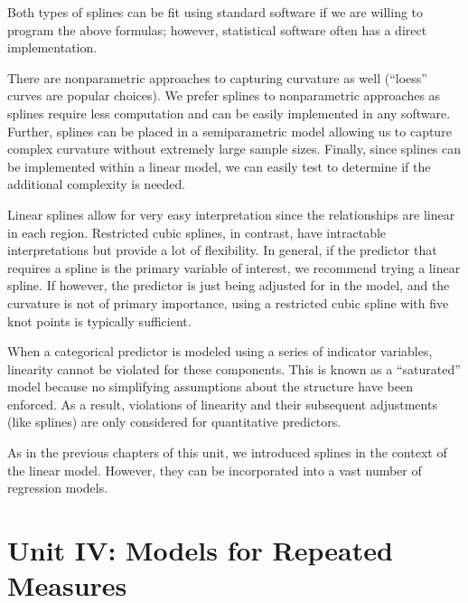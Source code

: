 \documentclass[
  letterpaper,
  DIV=11,
  numbers=noendperiod]{scrreprt}
\theoremstyle{definition}
\theoremstyle{definition}
\theoremstyle{remark}
\begin{document}
Both types of splines can be fit using standard software if we are
willing to program the above formulas; however, statistical software
often has a direct implementation.

There are nonparametric approaches to capturing curvature as well
(``loess'' curves are popular choices). We prefer splines to
nonparametric approaches as splines require less computation and can be
easily implemented in any software. Further, splines can be placed in a
semiparametric model allowing us to capture complex curvature without
extremely large sample sizes. Finally, since splines can be implemented
within a linear model, we can easily test to determine if the additional
complexity is needed.

Linear splines allow for very easy interpretation since the
relationships are linear in each region. Restricted cubic splines, in
contrast, have intractable interpretations but provide a lot of
flexibility. In general, if the predictor that requires a spline is the
primary variable of interest, we recommend trying a linear spline. If
however, the predictor is just being adjusted for in the model, and the
curvature is not of primary importance, using a restricted cubic spline
with five knot points is typically sufficient.

\begin{tcolorbox}[enhanced jigsaw, bottomrule=.15mm, titlerule=0mm, bottomtitle=1mm, colback=white, coltitle=black, rightrule=.15mm, leftrule=.75mm, toprule=.15mm, toptitle=1mm, left=2mm, opacityback=0, colframe=quarto-callout-note-color-frame, breakable, title=\textcolor{quarto-callout-note-color}{\faInfo}\hspace{0.5em}{Note}, arc=.35mm, colbacktitle=quarto-callout-note-color!10!white, opacitybacktitle=0.6]

When a categorical predictor is modeled using a series of indicator
variables, linearity cannot be violated for these components. This is
known as a ``saturated'' model because no simplifying assumptions about
the structure have been enforced. As a result, violations of linearity
and their subsequent adjustments (like splines) are only considered for
quantitative predictors.

\end{tcolorbox}

As in the previous chapters of this unit, we introduced splines in the
context of the linear model. However, they can be incorporated into a
vast number of regression models.

\part{Unit IV: Models for Repeated Measures}
\end{document}
